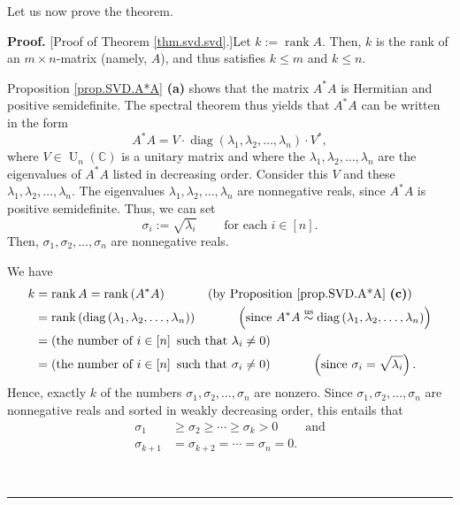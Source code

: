 \documentclass[numbers=enddot,12pt,final,onecolumn,notitlepage]{scrartcl}%
\numberwithin{exer}{subsection}
\theoremstyle{definition}
\newenvironment{proof}[1][Proof]{\noindent\textbf{#1.} }{\ \rule{0.5em}{0.5em}}
\begin{document}
Let us now prove the theorem.

\begin{proof}
[Proof of Theorem \ref{thm.svd.svd}.]Let $k:=\operatorname*{rank}A$. Then, $k$
is the rank of an $m\times n$-matrix (namely, $A$), and thus satisfies $k\leq
m$ and $k\leq n$.

Proposition \ref{prop.SVD.A*A} \textbf{(a)} shows that the matrix $A^{\ast}A$
is Hermitian and positive semidefinite. The spectral theorem thus yields that
$A^{\ast}A$ can be written in the form
\[
A^{\ast}A=V\cdot\operatorname*{diag}\left(  \lambda_{1},\lambda_{2}%
,\ldots,\lambda_{n}\right)  \cdot V^{\ast},
\]
where $V\in\operatorname*{U}\nolimits_{n}\left(  \mathbb{C}\right)  $ is a
unitary matrix and where the $\lambda_{1},\lambda_{2},\ldots,\lambda_{n}$ are
the eigenvalues of $A^{\ast}A$ listed in decreasing order. Consider this $V$
and these $\lambda_{1},\lambda_{2},\ldots,\lambda_{n}$. The eigenvalues
$\lambda_{1},\lambda_{2},\ldots,\lambda_{n}$ are nonnegative reals, since
$A^{\ast}A$ is positive semidefinite. Thus, we can set%
\[
\sigma_{i}:=\sqrt{\lambda_{i}}\ \ \ \ \ \ \ \ \ \ \text{for each }i\in\left[
n\right]  .
\]
Then, $\sigma_{1},\sigma_{2},\ldots,\sigma_{n}$ are nonnegative reals.

We have%
\begin{align*}
k  &  =\operatorname*{rank}A=\operatorname*{rank}\left(  A^{\ast}A\right)
\ \ \ \ \ \ \ \ \ \ \left(  \text{by Proposition \ref{prop.SVD.A*A}
\textbf{(c)}}\right) \\
&  =\operatorname*{rank}\left(  \operatorname*{diag}\left(  \lambda
_{1},\lambda_{2},\ldots,\lambda_{n}\right)  \right)
\ \ \ \ \ \ \ \ \ \ \left(  \text{since }A^{\ast}A\overset{\operatorname*{us}%
}{\sim}\operatorname*{diag}\left(  \lambda_{1},\lambda_{2},\ldots,\lambda
_{n}\right)  \right) \\
&  =\left(  \text{the number of }i\in\left[  n\right]  \text{ such that
}\lambda_{i}\neq0\right) \\
&  =\left(  \text{the number of }i\in\left[  n\right]  \text{ such that
}\sigma_{i}\neq0\right)  \ \ \ \ \ \ \ \ \ \ \left(  \text{since }\sigma
_{i}=\sqrt{\lambda_{i}}\right)  .
\end{align*}
Hence, exactly $k$ of the numbers $\sigma_{1},\sigma_{2},\ldots,\sigma_{n}$
are nonzero. Since $\sigma_{1},\sigma_{2},\ldots,\sigma_{n}$ are nonnegative
reals and sorted in weakly decreasing order, this entails that%
\begin{align*}
\sigma_{1}  &  \geq\sigma_{2}\geq\cdots\geq\sigma_{k}%
>0\ \ \ \ \ \ \ \ \ \ \text{and}\\
\sigma_{k+1}  &  =\sigma_{k+2}=\cdots=\sigma_{n}=0.
\end{align*}



\end{proof}
\end{document}
